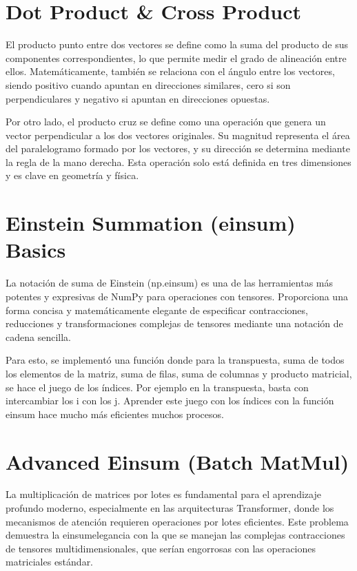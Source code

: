\documentclass[12pt, letterpaper]{article}
\begin{document}
\newpage

\section{Dot Product \& Cross Product}

El producto punto entre dos vectores se define como la suma del producto de sus componentes correspondientes, lo que permite medir 
el grado de alineación entre ellos. Matemáticamente, también se relaciona con el ángulo entre los vectores, siendo positivo cuando apuntan en direcciones 
similares, cero si son perpendiculares y negativo si apuntan en direcciones opuestas.

Por otro lado, el producto cruz se define como una operación que genera un vector perpendicular a los dos vectores originales. Su 
magnitud representa el área del paralelogramo formado por los vectores, y su dirección se determina mediante la regla de la mano 
derecha. Esta operación solo está definida en tres dimensiones y es clave en geometría y física.

\newpage

\section{Einstein Summation (einsum) Basics}

La notación de suma de Einstein (np.einsum) es una de las herramientas más potentes y expresivas de NumPy para operaciones con tensores. 
Proporciona una forma concisa y matemáticamente elegante de especificar contracciones, reducciones y transformaciones complejas de tensores mediante una notación de cadena sencilla.

Para esto, se implementó una función donde para la transpuesta, suma de todos los elementos de la matriz, suma de  filas, suma de columnas y producto matricial, se hace el juego de los 
índices. Por ejemplo en la transpuesta, basta con intercambiar los i con los j. Aprender este juego con los índices con la función einsum hace mucho más eficientes muchos procesos. 


\newpage

\section{Advanced Einsum (Batch MatMul)}

La multiplicación de matrices por lotes es fundamental para el aprendizaje profundo moderno, especialmente en las arquitecturas Transformer, donde los mecanismos 
de atención requieren operaciones por lotes eficientes. Este problema demuestra la einsumelegancia con la que se manejan las complejas contracciones 
de tensores multidimensionales, que serían engorrosas con las operaciones matriciales estándar. \\ 
\end{document}
